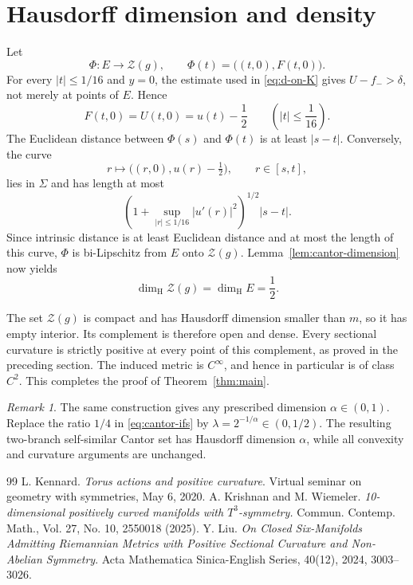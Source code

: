 \documentclass[11pt]{amsart}
\theoremstyle{remark}
\newtheorem{remark}[theorem]{Remark}
\newcommand{\Hd}{\dim_{\mathrm H}}
\begin{document}
\section{Hausdorff dimension and density}

Let
\[
 \Phi:E\longrightarrow\mathcal Z(g),
 \qquad
 \Phi(t)=\bigl((t,0),F(t,0)\bigr).
\]
For every $|t|\leq1/16$ and $y=0$, the estimate used in \eqref{eq:d-on-K} gives $U-f_->\delta$, not merely at points of $E$.  Hence
\[
 F(t,0)=U(t,0)=u(t)-\frac12
 \qquad\left(|t|\leq\frac1{16}\right).
\]
The Euclidean distance between $\Phi(s)$ and $\Phi(t)$ is at least $|s-t|$.  Conversely, the curve
\[
 r\longmapsto\bigl((r,0),u(r)-\tfrac12\bigr),
 \qquad r\in[s,t],
\]
lies in $\Sigma$ and has length at most
\[
 \left(1+\sup_{|r|\leq1/16}|u'(r)|^2\right)^{1/2}|s-t|.
\]
Since intrinsic distance is at least Euclidean distance and at most the length of this curve, $\Phi$ is bi-Lipschitz from $E$ onto $\mathcal Z(g)$.  Lemma~\ref{lem:cantor-dimension} now yields
\[
 \Hd\mathcal Z(g)=\Hd E=\frac12.
\]

The set $\mathcal Z(g)$ is compact and has Hausdorff dimension smaller than $m$, so it has empty interior.  Its complement is therefore open and dense.  Every sectional curvature is strictly positive at every point of this complement, as proved in the preceding section.  The induced metric is $C^\infty$, and hence in particular is of class $C^2$.  This completes the proof of Theorem~\ref{thm:main}.

\begin{remark}
The same construction gives any prescribed dimension $\alpha\in(0,1)$.  Replace the ratio $1/4$ in \eqref{eq:cantor-ifs} by
$\lambda=2^{-1/\alpha}\in(0,1/2)$.  The resulting two-branch self-similar Cantor set has Hausdorff dimension $\alpha$, while all convexity and curvature arguments are unchanged.
\end{remark}

\begin{thebibliography}{99}
 L. Kennard. \textit{Torus actions and positive curvature}. Virtual seminar on geometry with symmetries, May 6, 2020. 
 A. Krishnan and M. Wiemeler. \textit{10-dimensional positively curved manifolds with $T^3$-symmetry.} Commun. Contemp. Math., Vol. 27, No. 10, 2550018 (2025). 
 Y. Liu. \textit{On Closed Six-Manifolds Admitting Riemannian Metrics with Positive Sectional Curvature and Non-Abelian Symmetry}. Acta Mathematica Sinica-English Series, 40(12), 2024, 3003--3026.
\end{thebibliography}
\end{document}
